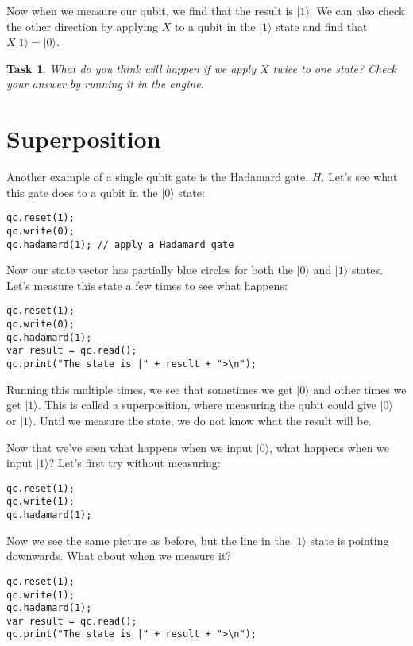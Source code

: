 \documentclass[twocolumn]{article}
\newtheorem{task}{Task}[section]
\begin{document}
Now when we measure our qubit, we find that the result is $|1\rangle$. We can also check the other direction by applying $X$ to a qubit in the $|1\rangle$ state and find that $X|1\rangle = |0\rangle$.

\begin{task}
What do you think will happen if we apply $X$ twice to one state? Check your answer by running it in the engine.
\end{task}

\section{Superposition}
\label{sec:superposition}

Another example of a single qubit gate is the Hadamard gate, $H$. Let's see what this gate does to a qubit in the $|0\rangle$ state:

\begin{lstlisting}
qc.reset(1);
qc.write(0);
qc.hadamard(1); // apply a Hadamard gate
\end{lstlisting}

Now our state vector has partially blue circles for both the $|0\rangle$ and $|1\rangle$ states. Let's measure this state a few times to see what happens:

\begin{lstlisting}
qc.reset(1);
qc.write(0);
qc.hadamard(1);
var result = qc.read();
qc.print("The state is |" + result + ">\n");
\end{lstlisting}

Running this multiple times, we see that sometimes we get $|0\rangle$ and other times we get $|1\rangle$. This is called a superposition, where measuring the qubit could give $|0\rangle$ or $|1\rangle$. Until we measure the state, we do not know what the result will be.

Now that we've seen what happens when we input $|0\rangle$, what happens when we input $|1\rangle$? Let's first try without measuring:

\begin{lstlisting}
qc.reset(1);
qc.write(1);
qc.hadamard(1);
\end{lstlisting}

Now we see the same picture as before, but the line in the $|1\rangle$ state is pointing downwards. What about when we measure it?

\begin{lstlisting}
qc.reset(1);
qc.write(1);
qc.hadamard(1);
var result = qc.read();
qc.print("The state is |" + result + ">\n");
\end{lstlisting}
\end{document}
